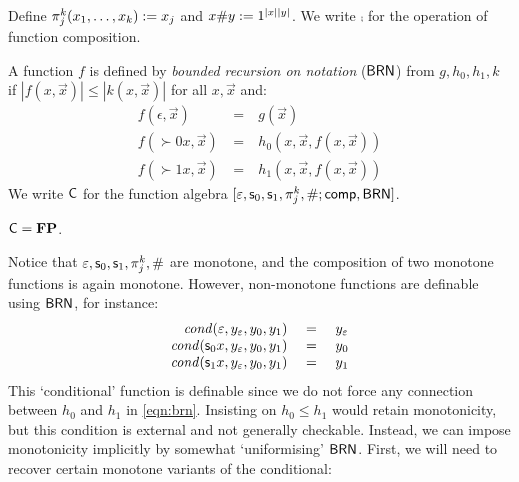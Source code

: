 \documentclass{lmcs}
\begin{document}
Define $\pi^k_j (x_1, \dots, x_k) := x_j$ and $x \# y := 1^{|x||y|}$. 
We write $\comp$ for the operation of function composition. 
\begin{definition}
	A function $f$ is defined by \emph{bounded recursion on notation} ($\mathsf{BRN}$) from $g, h_0, h_1, k$ if $|f(x, \vec x)| \leq |k(x , \vec x)|$ for all $x, \vec x$ and:
	\begin{equation}
	\label{eqn:brn}
	\begin{array}{rcl}
	f(\epsilon, \vec x) & \ = \ & g(\vec x) \\
	f(\succ 0 x , \vec x) & \ =\ &  h_0 (x , \vec x , f(x , \vec x)) \\
	f(\succ 1 x , \vec x) & \ =\ &  h_1 (x , \vec x , f(x , \vec x)) 
	\end{array}
	\end{equation}
	We write $\mathsf{C}$ for the function algebra $[\varepsilon, \mathsf s_{0}, \mathsf s_{1} , \pi^k_j , \# ; \mathsf{comp} , \mathsf{BRN} ]$.
\end{definition}
\begin{theorem}
	\label{thm:cobham-fp}
	$\mathsf{C} =  \mathbf{FP} $. 
\end{theorem}

\noindent
Notice that $\varepsilon, \mathsf s_{0} , \mathsf s_{1} , \pi^k_j , \#$ are monotone, and the composition of two monotone functions is again monotone.
However, non-monotone functions are definable using $\mathsf{BRN}$, for instance: 
\begin{equation}
\label{eqn:conditional}
\begin{array}{rcl}
\mathit{cond}(\varepsilon,y_\varepsilon, y_0,y_1) & \ = \ & y_\varepsilon \\
\mathit{cond}(\mathsf s_{0} x,y_\varepsilon, y_0,y_1) & \ = \ & y_0 \\
\mathit{cond}(\mathsf s_{1} x,y_\varepsilon, y_0,y_1) & \ = \ & y_1 
\end{array}
\end{equation}
\noindent
This `conditional' function is definable since we do not force any connection between $h_0 $ and $h_1$ in \eqref{eqn:brn}.
Insisting on $h_0 \leq h_1$ would retain monotonicity, but this condition is external and not generally checkable.
Instead, we can impose monotonicity implicitly by
somewhat `uniformising' $\mathsf{BRN}$.
%
First, we will need to recover certain monotone variants of the conditional:
\end{document}
